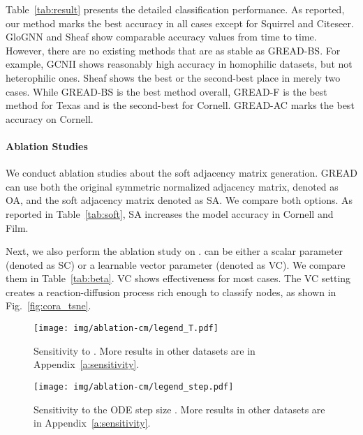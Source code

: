 \documentclass{article}
\theoremstyle{plain}
\theoremstyle{definition}
\theoremstyle{remark}
\begin{document}
Table~\ref{tab:result} presents the detailed classification performance. As reported, our method marks the best accuracy in all cases except for Squirrel and Citeseer. GloGNN and Sheaf show comparable accuracy values from time to time. However, there are no existing methods that are as stable as GREAD-BS. For example, GCNII shows reasonably high accuracy in homophilic datasets, but not heterophilic ones. Sheaf shows the best or the second-best place in merely two cases. While GREAD-BS is the best method overall, GREAD-F is the best method for Texas and is the second-best for Cornell. GREAD-AC marks the best accuracy on Cornell.

 
\paragraph{Ablation Studies} We conduct ablation studies about the soft adjacency matrix generation. GREAD can use both the original symmetric normalized adjacency matrix, denoted as OA, and the soft adjacency matrix denoted as SA. We compare both options. As reported in Table~\ref{tab:soft}, SA increases the model accuracy in Cornell and Film.

Next, we also perform the ablation study on .  can be either a scalar parameter (denoted as SC) or a learnable vector parameter (denoted as VC). We compare them in Table~\ref{tab:beta}. VC shows effectiveness for most cases. The VC setting creates a reaction-diffusion process rich enough to classify nodes, as shown in Fig.~\ref{fig:cora_tsne}.

 \begin{figure}[t]
    \centering
    \texttt{[image: img/ablation-cm/legend\_T.pdf]}
    \caption{Sensitivity to . More results in other datasets are in Appendix~\ref{a:sensitivity}.}
    \label{fig:sens_T}
\end{figure}
\begin{figure}[t]
    \centering
    \texttt{[image: img/ablation-cm/legend\_step.pdf]}
    \caption{Sensitivity to the ODE step size . More results in other datasets are in Appendix~\ref{a:sensitivity}.}
    \label{fig:sens_step}
\end{figure}
\end{document}
